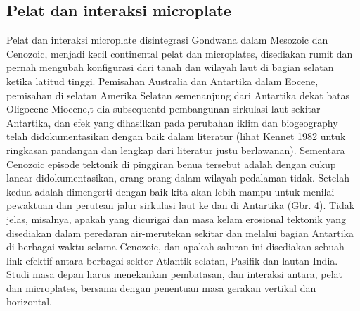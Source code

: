 \subsection{Pelat dan interaksi microplate}

		Pelat dan interaksi microplate disintegrasi Gondwana dalam Mesozoic dan Cenozoic, menjadi kecil continental pelat dan microplates, disediakan rumit 
	dan pernah mengubah konfigurasi dari tanah dan wilayah laut di bagian selatan ketika latitud tinggi. Pemisahan Australia dan Antartika dalam Eocene, 
	pemisahan di selatan Amerika Selatan semenanjung dari Antartika dekat batas Oligocene-Miocene,t dia subsequentd pembangunan sirkulasi laut sekitar 
	Antartika, dan efek yang dihasilkan pada perubahan iklim dan biogeography telah didokumentasikan dengan baik dalam literatur (lihat Kennet 1982 untuk 
	ringkasan pandangan dan lengkap dari literatur justu berlawanan). Sementara Cenozoic episode tektonik di pinggiran benua tersebut adalah dengan cukup 
	lancar didokumentasikan, orang-orang dalam wilayah pedalaman tidak. Setelah kedua adalah dimengerti dengan baik kita akan lebih mampu untuk menilai 
	pewaktuan dan perutean jalur sirkulasi laut ke dan di Antartika (Gbr. 4). Tidak jelas, misalnya, apakah yang dicurigai dan masa kelam erosional tektonik 
	yang disediakan dalam peredaran air-merutekan sekitar dan melalui bagian Antartika di berbagai waktu selama Cenozoic, dan apakah saluran ini disediakan 
	sebuah link efektif antara berbagai sektor Atlantik selatan, Pasifik dan lautan India. Studi masa depan harus menekankan pembatasan, dan interaksi antara, 
	pelat dan microplates, bersama dengan penentuan masa gerakan vertikal dan horizontal.
	
	
	
	

	
		
	
	
		
